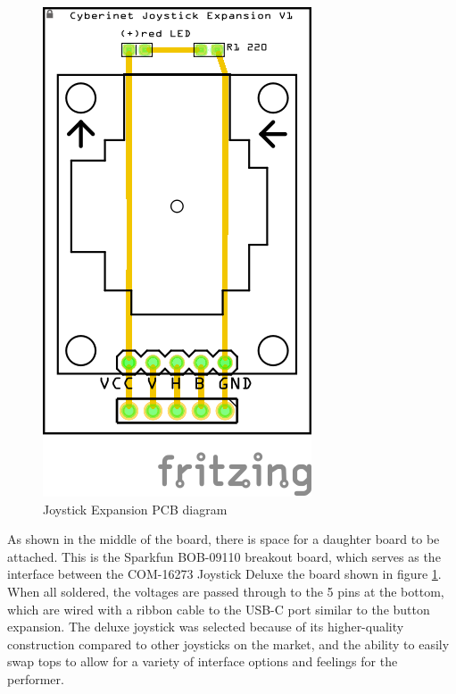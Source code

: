 \begin{figure}
    \centering
    \includegraphics{diagrams/PCBs/thumbPCBv1.png}
    \caption{Joystick Expansion PCB diagram}
    \label{fig:jsPCB}
\end{figure}

As shown in the middle of the board, there is space for a daughter board to be attached. This is the Sparkfun BOB-09110 breakout board, which serves as the interface between the COM-16273 Joystick Deluxe the board shown in figure \ref{fig:jsPCB}. When all soldered, the voltages are passed through to the 5 pins at the bottom, which are wired with a ribbon cable to the USB-C port similar to the button expansion. The deluxe joystick was selected because of its higher-quality construction compared to other joysticks on the market, and the ability to easily swap tops to allow for a variety of interface options and feelings for the performer.

